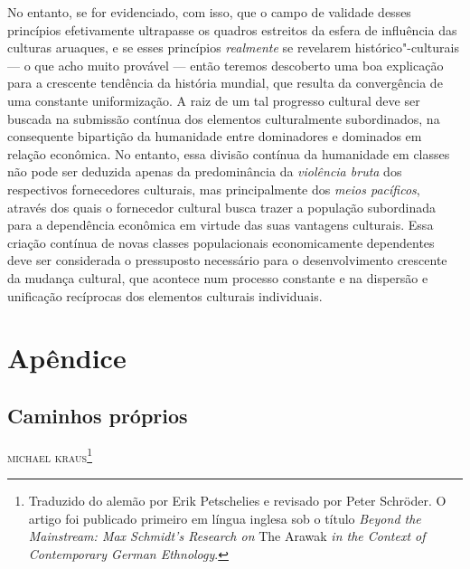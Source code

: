 No entanto, se for evidenciado, com isso, que o campo de validade desses
princípios efetivamente ultrapasse os quadros estreitos da esfera de
influência das culturas aruaques, e se esses princípios \textit{realmente} se
revelarem histórico"-culturais --- o que acho muito provável --- então teremos 
descoberto uma boa explicação para a crescente tendência da
história mundial, que resulta da convergência de uma constante
uniformização. A raiz de um tal progresso cultural deve ser buscada na
submissão contínua dos elementos culturalmente subordinados, na
consequente bipartição da humanidade entre dominadores e dominados em
relação econômica. No entanto, essa divisão contínua da humanidade em
classes não pode ser deduzida apenas da predominância da \textit{violência bruta}
dos respectivos fornecedores culturais, mas principalmente dos
\textit{meios pacíficos}, através dos quais o fornecedor cultural busca trazer a
população subordinada para a dependência econômica em virtude das suas
vantagens culturais. Essa criação contínua de novas classes
populacionais economicamente dependentes deve ser considerada o
pressuposto necessário para o desenvolvimento crescente da mudança
cultural, que acontece num processo constante e na dispersão e
unificação recíprocas dos elementos culturais individuais.

\part{Apêndice}

\chapter*{Caminhos próprios\smallskip{}}


\begin{flushright}
\textsc{michael kraus}\footnote{Traduzido do  alemão por Erik Petschelies e revisado por Peter Schröder. O artigo foi publicado primeiro em língua inglesa sob o título \textit{Beyond the Mainstream: Max Schmidt's Research on} The Arawak \textit{in the Context of Contemporary German Ethnology}.} 
\end{flushright}

